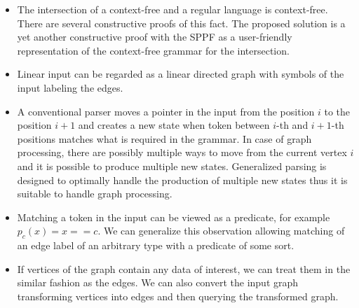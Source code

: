 \begin{itemize}
\item The intersection of a context-free and a regular language is context-free. There are several constructive proofs of this fact.
The proposed solution is a yet another constructive proof with the SPPF as a user-friendly representation of the context-free grammar for the intersection.
\item Linear input can be regarded as a linear directed graph with symbols of the input labeling the edges.
\item A conventional parser moves a pointer in the input from the position $i$ to the position $i+1$ and creates a new state when token between $i$-th and $i+1$-th positions matches what is required in the grammar.
In case of graph processing, there are possibly multiple ways to move from the current vertex $i$ and it is possible to produce multiple new states.
Generalized parsing is designed to optimally handle the production of multiple new states thus it is suitable to handle graph processing.
\item Matching a token in the input can be viewed as a predicate, for example $p_c (x) = x == c$. 
We can generalize this observation allowing matching of an edge label of an arbitrary type with a predicate of some sort.
\item If vertices of the graph contain any data of interest, we can treat them in the similar fashion as the edges. We can also convert the input graph transforming vertices into edges and then querying the transformed graph.
\end{itemize}


